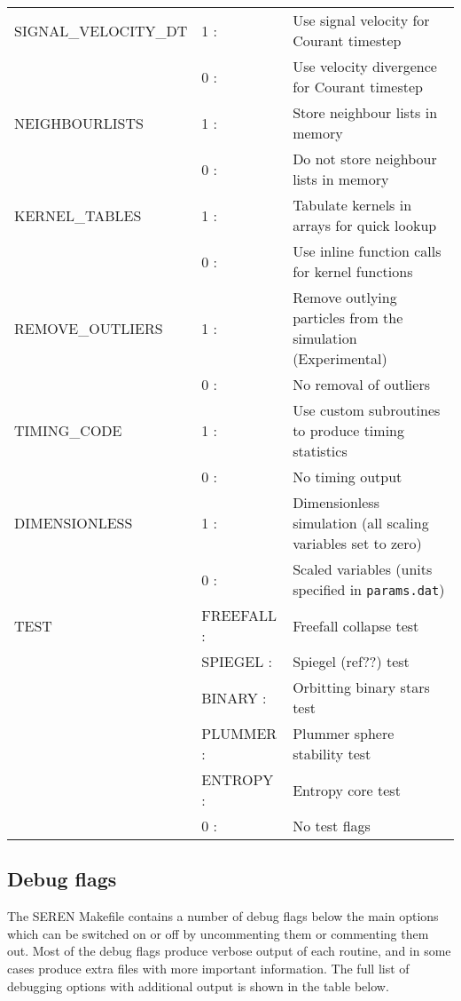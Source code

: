 \documentclass[a4paper]{article}
\newcommand{\NAME}{SEREN }
\newcommand{\var}[1]{\texttt{#1}}
\begin{document}
\begin{center}
\begin{supertabular}{|p{4.6cm}|p{4.6cm} p{6.4cm}|}
 SIGNAL\_VELOCITY\_DT  & 1 :& Use signal velocity for Courant timestep \\
                       & 0 :& Use velocity divergence for Courant timestep \\ \hline

 NEIGHBOURLISTS & 1 :& Store neighbour lists in memory \\
                & 0 :& Do not store neighbour lists in memory \\ \hline

 KERNEL\_TABLES & 1 :& Tabulate kernels in arrays for quick lookup \\ 
                & 0 :& Use inline function calls for kernel functions \\ \hline

 REMOVE\_OUTLIERS & 1 :& Remove outlying particles from the simulation (Experimental) \\
                  & 0 :& No removal of outliers \\ \hline

 TIMING\_CODE  & 1 :& Use custom subroutines to produce timing statistics \\
               & 0 :& No timing output \\ \hline

 DIMENSIONLESS & 1 :& Dimensionless simulation (all scaling variables 
                      set to zero) \\
               & 0 :& Scaled variables (units specified in \var{params.dat})\\ \hline

 TEST          & FREEFALL :& Freefall collapse test \\
               & SPIEGEL  :& Spiegel (ref??) test \\
               & BINARY   :& Orbitting binary stars test \\
               & PLUMMER  :& Plummer sphere stability test \\
               & ENTROPY  :& Entropy core test \\
               & 0        :& No test flags \\ \hline

\end{supertabular}
\end{center}
\vspace{1cm}

\newpage


\subsection{Debug flags} \label{SS:PARAMS}
The \NAME Makefile contains a number of debug flags below the main options which can be switched on or off by uncommenting them or commenting them out.  Most of the debug flags produce verbose output of each routine, and in some cases produce extra files with more important information.  The full list of debugging options with additional output is shown in the table below.\newline
\end{document}
